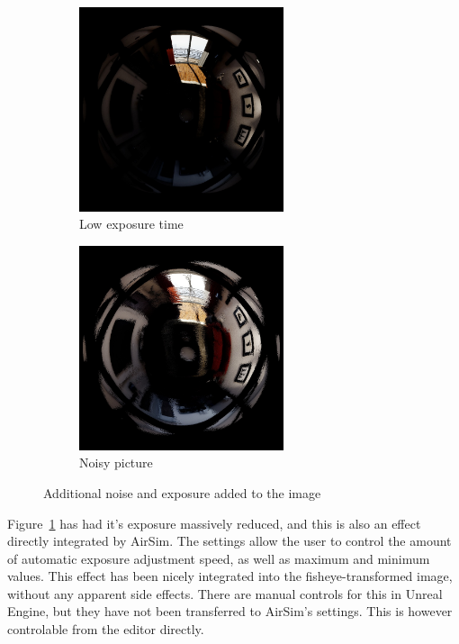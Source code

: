 \begin{figure}[!htb]
    \centering
    \begin{subfigure}{0.45\textwidth}
        \centering
        \includegraphics[height=6cm]{rapport/fig/Results/pp/no_nooise_high_min_brightness.jpeg}
        \caption{Low exposure time}
        \label{fig:res_pp_exposure_yes}
    \end{subfigure}
    \begin{subfigure}{0.45\textwidth}
        \centering
        \includegraphics[height=6cm]{rapport/fig/Results/pp/noise_normal_exposure.jpeg}
        \caption{Noisy picture}
        \label{fig:res_pp_noise_yes}
    \end{subfigure}
    \caption{Additional noise and exposure added to the image}
    \label{fig:res_pp}
\end{figure}

Figure~\ref{fig:res_pp_exposure_yes} has had it's exposure massively reduced, and this is also an effect directly integrated by AirSim. The settings allow the user to control the amount of automatic exposure adjustment speed, as well as maximum and minimum values. This effect has been nicely integrated into the fisheye-transformed image, without any apparent side effects. There are manual controls for this in Unreal Engine, but they have not been transferred to AirSim's settings. This is however controlable from the editor directly.

